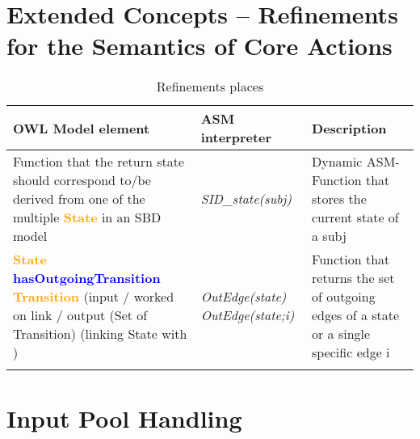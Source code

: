 \section{Extended Concepts  – Refinements for the Semantics of Core Actions}

\begin{landscape}
	\begin {longtable} {| p{} | p{} | p{}|}
	\hline
	OWL Model element &   ASM interpreter & Description\\
	\toprule
	\endhead
	\hline
	
	Function that the return state should correspond to/be derived from one of the multiple \textcolor{orange}{\textbf{State }}in an SBD model
	& \textit{SID\_state(subj)} 
	&  Dynamic ASM-Function that stores the current state of a subj
	\\
	\hline
	
	\textcolor{orange}{\textbf{State }} \textcolor{blue}{\textbf{hasOutgoingTransition }} \textcolor{orange}{\textbf{Transition }}  \newline
	(input / worked on link  / output (Set of Transition)
	(linking State with )
	& \textit{OutEdge(state) \newline
		OutEdge(state;i)}
	& Function that returns the set of outgoing edges of a state or a single specific edge i
	\\
	\hline
	\caption{Refinements places}
\label{tab:Refinrments places}
\end{longtable}
\end {landscape}


\section{Input Pool Handling}



